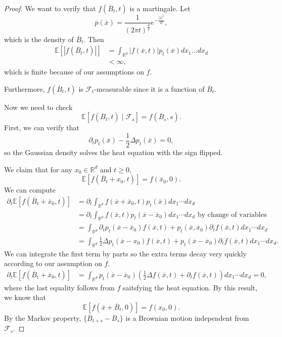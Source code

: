 \documentclass{tufte-handout}
\newcommand*\R{\mathbb{R}}
\newcommand*\E{\mathbb{E}}
\theoremstyle{definition}
\begin{document}
\begin{proof}
	We want to verify that $f(\overline{B}_t,t)$ is a martingale.
	Let \[
		\overline{p}(\overline{x}) = \frac{1}{\left( 2\pi t \right)^{\frac{d}{2}}} e^{- \frac{\left| \overline{x} \right|^2}{2t}}
	,\] which is the density of $\overline{B}_t$. Then 
	\begin{align*}
		\E\left[\left| f(\overline{B}_t, t) \right|\right] &= \int_{\R^d}^{} \left| f(\overline{x}, t) \right| p_t(\overline{x}) dx_1\ldots dx_d  \\
														   &< \infty
	,\end{align*}
	which is finite because of our assumptions on $f$.

	Furthermore, $f(\overline{B}_t, t)$ is $\mathscr{F}_t$-measurable since it is a function of $\overline{B}_t$.

	Now we need to check \[
		\E\left[f(\overline{B}_t, t) \mid \mathscr{F}_s\right]  = f(\overline{B}_s, s)
	.\] 
	First, we can verify that \[
		\partial_t p_t(\overline{x}) - \frac{1}{2}\Delta p_t(\overline{x}) = 0
	,\] so the Gaussian density solves the heat equation with the sign flipped.

	We claim that for any $x_0 \in \R^d$ and $t \ge 0$, \[
		\E\left[f(\overline{B}_t + x_0, t)\right] = f(\overline{x}_0,0)
	.\] We can compute
	\begin{align*}
		\partial_t \E\left[f(\overline{B}_t + \overline{x}_0 , t)\right] &= \partial_t \int_{\R^d}^{} f(\overline{x}+\overline{x}_0, t) p_t(\overline{x})dx_1\cdots dx_d  \\
				 &= \partial_t \int_{\R^d}^{} f(\overline{x},t) p_t(\overline{x}-\overline{x}_0) dx_1\cdots dx_d \text{ by change of variables} \\
				 &= \int_{\R^d}^{} \partial_t p_t(\overline{x}-\overline{x}_0) f(\overline{x},t) + p_t(\overline{x},\overline{x}_0) \partial_t f(\overline{x}, t)dx_1\cdots dx_d \\
				 &= \int_{\R^d}^{} \frac{1}{2} \Delta p_t(\overline{x}-x_0) f(\overline{x},t) + p_t(\overline{x}-\overline{x}_0) \partial_t f(\overline{x}, t) dx_1 \cdots dx_d
	.\end{align*}
	We can integrate the first term by parts so the extra terms decay very quickly according to our assumption on $f$.
	\begin{align*}
		\partial_t \E\left[f(\overline{B}_t + \overline{x}_0 , t)\right] &= \int_{\R^d}^{} p_t (\overline{x} - \overline{x}_0) \left( \frac{1}{2}\Delta f(\overline{x},t)  + \partial_t f(\overline{x},t) \right)dx_1\cdots dx_d = 0	
	,\end{align*}
	where the last equality follows from $f$ saitsfying the heat equation.
	By this result, we know that \[
		\E\left[f(\overline{x} + \overline{B}_t, 0)\right] = f(x_0,0)
	.\] By the Markov property, $\{\overline{B}_{t+s} - \overline{B}_s\}$ is a Brownian motion independent from $\mathscr{F}_s$. 


\end{proof}
\end{document}
